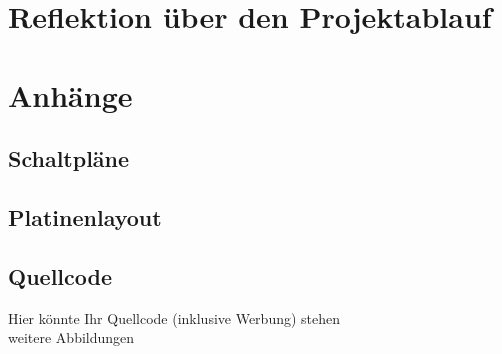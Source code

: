 \documentclass [11pt,a4paper,bibliography=totoc]{scrreprt}%
\begin{document}
\chapter{Reflektion über den Projektablauf}

\chapter{Anhänge}
\section{Schaltpläne}

\section{Platinenlayout}

\section{Quellcode}
Hier könnte Ihr Quellcode (inklusive Werbung) stehen\\
%


weitere Abbildungen
\listoffigures
\listoftables
\end{document}
